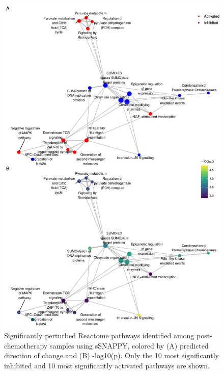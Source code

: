 \documentclass[9pt,a4paper,]{extarticle}
\begin{document}
\begin{figure}

{\centering \includegraphics[width=1\linewidth]{sSNAPPY_paper_files/figure-latex/Figure4-1} 

}

\caption{Significantly perturbed Reactome pathways identified among post-chemotherapy samples using sSNAPPY, colored by (A) predicted direction of change and (B) -log10(p). Only the 10 most significantly inhibited and 10 most significantly activated pathways are shown.}\label{fig:Figure4}
\end{figure}
\end{document}
